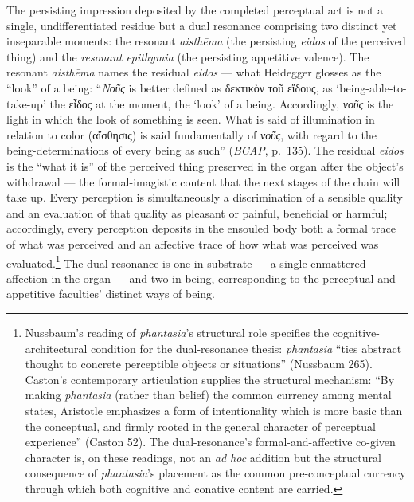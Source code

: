\documentclass{article}
\newcommand{\gk}[1]{{\greekfont #1}}
\begin{document}
The persisting impression deposited by the completed perceptual act is not a single, undifferentiated residue but a dual resonance comprising two distinct yet inseparable moments: the resonant \textit{aisthēma} (the persisting \textit{eidos} of the perceived thing) and the \textit{resonant epithymia} (the persisting appetitive valence). The resonant \textit{aisthēma} names the residual \textit{eidos} --- what Heidegger glosses as the ``look'' of a being: ``\textit{Νοῦς} is better defined as \gk{δεκτικὸν τοῦ εἴδους}, as `being-able-to-take-up' the \gk{εἶδος} at the moment, the `look' of a being. Accordingly, \textit{νοῦς} is the light in which the look of something is seen. What is said of illumination in relation to color (\gk{αἴσθησις}) is said fundamentally of \textit{νοῦς}, with regard to the being-determinations of every being as such'' (\textit{BCAP}, p.~135). The residual \textit{eidos} is the ``what it is'' of the perceived thing preserved in the organ after the object's withdrawal --- the formal-imagistic content that the next stages of the chain will take up. Every perception is simultaneously a discrimination of a sensible quality and an evaluation of that quality as pleasant or painful, beneficial or harmful; accordingly, every perception deposits in the ensouled body both a formal trace of what was perceived and an affective trace of how what was perceived was evaluated.\footnote{Nussbaum's reading of \textit{phantasia}'s structural role specifies the cognitive-architectural condition for the dual-resonance thesis: \textit{phantasia} ``ties abstract thought to concrete perceptible objects or situations'' (Nussbaum 265). Caston's contemporary articulation supplies the structural mechanism: ``By making \textit{phantasia} (rather than belief) the common currency among mental states, Aristotle emphasizes a form of intentionality which is more basic than the conceptual, and firmly rooted in the general character of perceptual experience'' (Caston 52). The dual-resonance's formal-and-affective co-given character is, on these readings, not an \textit{ad hoc} addition but the structural consequence of \textit{phantasia}'s placement as the common pre-conceptual currency through which both cognitive and conative content are carried.} The dual resonance is one in substrate --- a single enmattered affection in the organ --- and two in being, corresponding to the perceptual and appetitive faculties' distinct ways of being.
\end{document}
